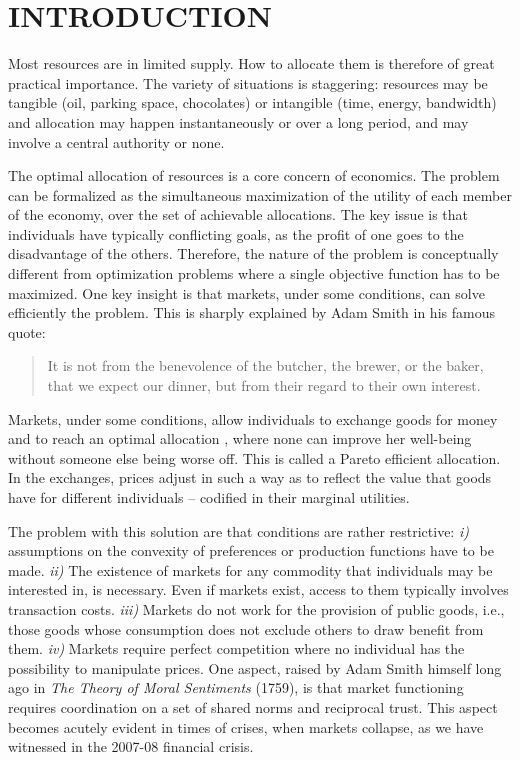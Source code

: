 \documentclass[aps,twocolumn,nofootinbib,sortedaddress,reprint]{revtex4-1}
\begin{document}
\maketitle \tableofcontents
\section{INTRODUCTION}
\label{sec:intro}


Most resources are in limited supply. How to allocate them is therefore of great practical importance. The variety of situations is staggering: resources may be tangible (oil, parking space, chocolates) or intangible (time, energy, bandwidth) and allocation may happen instantaneously or over a long period, and may involve a central authority or none.

The optimal allocation of resources is a core concern of economics. The problem can be formalized as the simultaneous maximization of the utility of each member of the economy, over the set of achievable allocations. The key issue is that individuals have typically conflicting goals, as the profit of one goes to the disadvantage of the others. Therefore, the nature of the problem is conceptually different from optimization problems where a single objective function has to be maximized.
One key insight is that markets, under some conditions, can solve efficiently the problem. This is sharply explained by Adam Smith in his famous quote:
\begin{quote}
It is not from the benevolence of the butcher, the brewer, or the baker, that we expect our dinner, but from their regard to their own interest.
\end{quote}
Markets, under some conditions, allow individuals to exchange goods for money and to reach an optimal allocation \cite{mas1995microeconomic}, where none can improve her well-being without someone else being worse off. This is called a Pareto efficient allocation.
In the exchanges, prices adjust in such a way as to reflect the value that goods have for different individuals -- codified in their marginal utilities.

The problem with this solution are that conditions are rather restrictive: {\em i)} assumptions on the convexity of preferences or production functions have to be made. {\em ii)} The existence of markets for any commodity that individuals may be interested in, is necessary. Even if markets exist, access to them typically involves transaction costs. {\em iii)} Markets do not work for the provision of public goods, i.e., those goods whose consumption does not exclude others to draw benefit from them. {\em iv)} Markets require perfect competition where no individual has the possibility to manipulate prices. One aspect, raised by Adam Smith himself long ago in {\em The Theory of Moral Sentiments} (1759), is that market functioning requires coordination on a set of shared norms and reciprocal trust. This aspect becomes acutely evident in times of crises, when markets collapse, as we have witnessed in the 2007-08 financial crisis.
\end{document}
